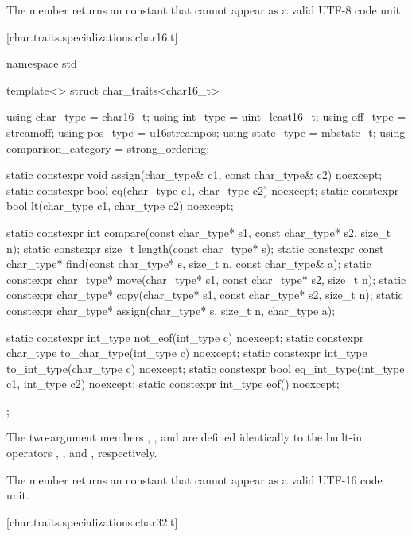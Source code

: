\pnum
{}%
The member  returns an
 constant
that cannot appear as a valid UTF-8 code unit.

[char.traits.specializations.char16.t]{}

%
\begin{codeblock}
namespace std {
  template<> struct char_traits<char16_t> {
    using char_type  = char16_t;
    using int_type   = uint_least16_t;
    using off_type   = streamoff;
    using pos_type   = u16streampos;
    using state_type = mbstate_t;
    using comparison_category = strong_ordering;

    static constexpr void assign(char_type& c1, const char_type& c2) noexcept;
    static constexpr bool eq(char_type c1, char_type c2) noexcept;
    static constexpr bool lt(char_type c1, char_type c2) noexcept;

    static constexpr int compare(const char_type* s1, const char_type* s2, size_t n);
    static constexpr size_t length(const char_type* s);
    static constexpr const char_type* find(const char_type* s, size_t n,
                                           const char_type& a);
    static constexpr char_type* move(char_type* s1, const char_type* s2, size_t n);
    static constexpr char_type* copy(char_type* s1, const char_type* s2, size_t n);
    static constexpr char_type* assign(char_type* s, size_t n, char_type a);

    static constexpr int_type not_eof(int_type c) noexcept;
    static constexpr char_type to_char_type(int_type c) noexcept;
    static constexpr int_type to_int_type(char_type c) noexcept;
    static constexpr bool eq_int_type(int_type c1, int_type c2) noexcept;
    static constexpr int_type eof() noexcept;
  };
}
\end{codeblock}


\pnum
The two-argument members ,
, and  are defined identically to
the built-in operators \tcode{=}, \tcode{==}, and
\tcode{<}, respectively.

\pnum
The member  returns an
 constant that cannot appear
as a valid UTF-16 code unit.

[char.traits.specializations.char32.t]{}

